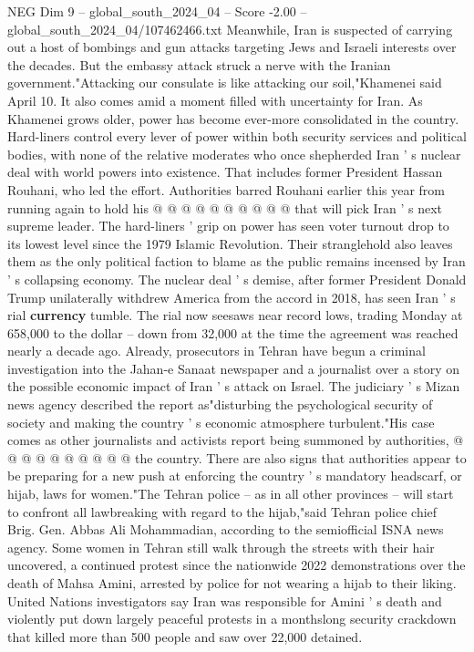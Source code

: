\begin{textsample}{NEG Dim 9 – global\_south\_2024\_04 – Score -2.00 – global\_south\_2024\_04/107462466.txt}
Meanwhile, Iran is suspected of carrying out a host of bombings and gun attacks targeting Jews and Israeli interests over the decades.
But the embassy attack struck a nerve with the Iranian government."Attacking our consulate is like attacking our soil,"Khamenei said April 10.
It also comes amid a moment filled with uncertainty for Iran.
As Khamenei grows older, power has become ever-more consolidated in the country.
Hard-liners control every lever of power within both security services and political bodies, with none of the relative moderates who once shepherded Iran ' s nuclear deal with world powers into existence.
That includes former President Hassan Rouhani, who led the effort.
Authorities barred Rouhani earlier this year from running again to hold his @ @ @ @ @ @ @ @ @ @ that will pick Iran ' s next supreme leader.
The hard-liners ' grip on power has seen voter turnout drop to its lowest level since the 1979 Islamic Revolution.
Their stranglehold also leaves them as the only political faction to blame as the public remains incensed by Iran ' s collapsing economy.
The nuclear deal ' s demise, after former President Donald Trump unilaterally withdrew America from the accord in 2018, has seen Iran ' s rial \textbf{currency} tumble.
The rial now seesaws near record lows, trading Monday at 658,000 to the dollar -- down from 32,000 at the time the agreement was reached nearly a decade ago.
Already, prosecutors in Tehran have begun a criminal investigation into the Jahan-e Sanaat newspaper and a journalist over a story on the possible economic impact of Iran ' s attack on Israel.
The judiciary ' s Mizan news agency described the report as"disturbing the psychological security of society and making the country ' s economic atmosphere turbulent."His case comes as other journalists and activists report being summoned by authorities, @ @ @ @ @ @ @ @ @ @ the country.
There are also signs that authorities appear to be preparing for a new push at enforcing the country ' s mandatory headscarf, or hijab, laws for women."The Tehran police -- as in all other provinces -- will start to confront all lawbreaking with regard to the hijab,"said Tehran police chief Brig.
Gen.
Abbas Ali Mohammadian, according to the semiofficial ISNA news agency.
Some women in Tehran still walk through the streets with their hair uncovered, a continued protest since the nationwide 2022 demonstrations over the death of Mahsa Amini, arrested by police for not wearing a hijab to their liking.
United Nations investigators say Iran was responsible for Amini ' s death and violently put down largely peaceful protests in a monthslong security crackdown that killed more than 500 people and saw over 22,000 detained.

\end{textsample}
